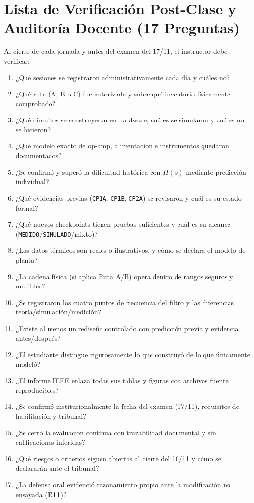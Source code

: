 \documentclass[11pt, a4paper]{article}
\begin{document}
\section{Lista de Verificación Post-Clase y Auditoría Docente (17 Preguntas)}
Al cierre de cada jornada y antes del examen del 17/11, el instructor debe verificar:
\begin{enumerate}[noitemsep, font=\footnotesize]
    \item ¿Qué sesiones se registraron administrativamente cada día y cuáles no?
    \item ¿Qué ruta (A, B o C) fue autorizada y sobre qué inventario físicamente comprobado?
    \item ¿Qué circuitos se construyeron en hardware, cuáles se simularon y cuáles no se hicieron?
    \item ¿Qué modelo exacto de op-amp, alimentación e instrumentos quedaron documentados?
    \item ¿Se confirmó y superó la dificultad histórica con $H(s)$ mediante predicción individual?
    \item ¿Qué evidencias previas (\texttt{CP1A}, \texttt{CP1B}, \texttt{CP2A}) se revisaron y cuál es su estado formal?
    \item ¿Qué nuevos checkpoints tienen pruebas suficientes y cuál es su alcance (\texttt{MEDIDO}/\texttt{SIMULADO}/mixto)?
    \item ¿Los datos térmicos son reales o ilustrativos, y cómo se declara el modelo de planta?
    \item ¿La cadena física (si aplica Ruta A/B) opera dentro de rangos seguros y medibles?
    \item ¿Se registraron los cuatro puntos de frecuencia del filtro y las diferencias teoría/simulación/medición?
    \item ¿Existe al menos un rediseño controlado con predicción previa y evidencia antes/después?
    \item ¿El estudiante distingue rigurosamente lo que construyó de lo que únicamente modeló?
    \item ¿El informe IEEE enlaza todas sus tablas y figuras con archivos fuente reproducibles?
    \item ¿Se confirmó institucionalmente la fecha del examen (17/11), requisitos de habilitación y tribunal?
    \item ¿Se cerró la evaluación continua con trazabilidad documental y sin calificaciones inferidas?
    \item ¿Qué riesgos o criterios siguen abiertos al cierre del 16/11 y cómo se declararán ante el tribunal?
    \item ¿La defensa oral evidenció razonamiento propio ante la modificación no ensayada (\textbf{E11})?
\end{enumerate}
\end{document}
